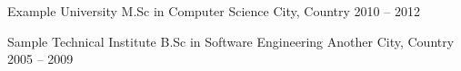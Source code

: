 \documentclass[]{awesome-cv}
\newcommand{\cvtextfont}{\sffamily\normalsize}
\begin{document}
{\cvtextfont
{}
}

\begin{cventries}
  \eduentry
    {Example University}
    {M.Sc in Computer Science}
    {City, Country}
    {2010 -- 2012}
    
  \eduentry
    {Sample Technical Institute}
    {B.Sc in Software Engineering}
    {Another City, Country}
    {2005 -- 2009}
    
\end{cventries}
\end{document}
